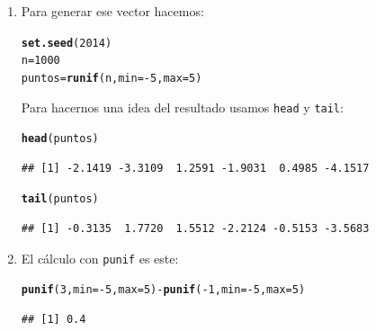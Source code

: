 \documentclass[10pt,a4paper]{article}\usepackage[]{graphicx}\usepackage[]{color}
\makeatletter
\newcommand{\hlnum}[1]{\textcolor[rgb]{0.686,0.059,0.569}{#1}}%
\newcommand{\hlopt}[1]{\textcolor[rgb]{0,0,0}{#1}}%
\newcommand{\hlstd}[1]{\textcolor[rgb]{0.345,0.345,0.345}{#1}}%
\newcommand{\hlkwb}[1]{\textcolor[rgb]{0.69,0.353,0.396}{#1}}%
\newcommand{\hlkwc}[1]{\textcolor[rgb]{0.333,0.667,0.333}{#1}}%
\newcommand{\hlkwd}[1]{\textcolor[rgb]{0.737,0.353,0.396}{\textbf{#1}}}%
\newenvironment{kframe}{%
 \def\at@end@of@kframe{}%
 \ifinner\ifhmode%
  \def\at@end@of@kframe{\end{minipage}}%
  \begin{minipage}{\columnwidth}%
 \fi\fi%
 \def\FrameCommand##1{\hskip\@totalleftmargin \hskip-\fboxsep
 \colorbox{shadecolor}{##1}\hskip-\fboxsep
     \hskip-\linewidth \hskip-\@totalleftmargin \hskip\columnwidth}%
 \MakeFramed {\advance\hsize-\width
   \@totalleftmargin\z@ \linewidth\hsize
   \@setminipage}}%
 {\par\unskip\endMakeFramed%
 \at@end@of@kframe}
\newenvironment{knitrout}{}{} %
\makeatother
\begin{document}
\begin{enumerate}
  \item Para generar ese vector hacemos:
\begin{knitrout}
\color{fgcolor}\begin{kframe}
\begin{alltt}
\hlkwd{set.seed}\hlstd{(}\hlnum{2014}\hlstd{)}
\hlstd{n} \hlkwb{=} \hlnum{1000}
\hlstd{puntos} \hlkwb{=} \hlkwd{runif}\hlstd{(n,} \hlkwc{min}\hlstd{=}\hlopt{-}\hlnum{5}\hlstd{,} \hlkwc{max}\hlstd{=}\hlnum{5}\hlstd{)}
\end{alltt}
\end{kframe}
\end{knitrout}
  Para hacernos una idea del resultado usamos {\tt head} y {\tt tail}:
\begin{knitrout}
\color{fgcolor}\begin{kframe}
\begin{alltt}
\hlkwd{head}\hlstd{(puntos)}
\end{alltt}
\begin{verbatim}
## [1] -2.1419 -3.3109  1.2591 -1.9031  0.4985 -4.1517
\end{verbatim}
\begin{alltt}
\hlkwd{tail}\hlstd{(puntos)}
\end{alltt}
\begin{verbatim}
## [1] -0.3135  1.7720  1.5512 -2.2124 -0.5153 -3.5683
\end{verbatim}
\end{kframe}
\end{knitrout}

  \item El cálculo con {\tt punif} es este:
\begin{knitrout}
\color{fgcolor}\begin{kframe}
\begin{alltt}
\hlkwd{punif}\hlstd{(}\hlnum{3}\hlstd{,} \hlkwc{min}\hlstd{=}\hlopt{-}\hlnum{5}\hlstd{,} \hlkwc{max}\hlstd{=}\hlnum{5}\hlstd{)} \hlopt{-} \hlkwd{punif}\hlstd{(}\hlopt{-}\hlnum{1}\hlstd{,} \hlkwc{min}\hlstd{=}\hlopt{-}\hlnum{5}\hlstd{,} \hlkwc{max}\hlstd{=}\hlnum{5}\hlstd{)}
\end{alltt}
\begin{verbatim}
## [1] 0.4
\end{verbatim}
\end{kframe}
\end{knitrout}


\end{enumerate}
\end{document}
